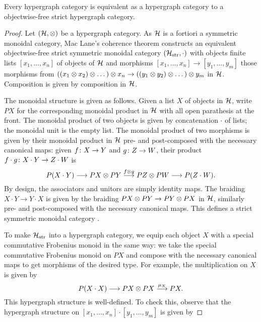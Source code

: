 \begin{proposition}
  Every hypergraph category is equivalent as a hypergraph category to a
  objectwise-free strict hypergraph category.
\end{proposition}
\begin{proof}
  Let $(\mathcal H,\otimes)$ be a hypergraph category. As $\mathcal H$ is a fortiori a
  symmetric monoidal category, Mac Lane's coherence theorem constructs
  an equivalent objectwise-free strict symmetric monoidal category $(\mathcal
  H_{\mathrm{str}}, \cdot)$ with objects finite lists $[x_1,\dots,x_n]$ of
  objects of $\mathcal H$ and morphisms $[x_1,\dots,x_n] \to [y_1,\dots,y_m]$ those
  morphisms from $((x_1 \otimes x_2) \otimes \dots) \otimes x_n \to ((y_1 \otimes y_2) \otimes
  \dots) \otimes y_m$ in $\mathcal H$.  Composition is given by composition in $\mathcal H$.
  
  The monoidal structure is given as follows. Given a list $X$ of objects in
  $\mathcal H$, write $PX$ for the corresponding monoidal product in $\mathcal H$ with all
  open parathesis at the front.  The monoidal product of two objects is given by
  concatenation $\cdot$ of lists; the monoidal unit is the empty list. The
  monoidal product of two morphisms is given by their monoidal product in $\mathcal
  H$ pre- and post-composed with the necessary canonical maps: given $f{\colon} X
  \to Y$ and $g{\colon} Z \to W$, their product $f\cdot g{\colon} X\cdot Y \to Z \cdot
  W$ is 
  \[
    P(X \cdot Y) \longrightarrow PX \otimes PY \stackrel{f \otimes g}{\longrightarrow}
    PZ \otimes PW \longrightarrow P(Z \cdot W).
  \]
  By design, the associators and unitors are simply identity maps. The braiding
  $X \cdot Y \to Y \cdot X$ is given by the braiding $PX \otimes PY \to PY \otimes PX$
  in $\mathcal H$, similarly pre- and post-composed with the necessary canonical
  maps. This defines a strict symmetric monoidal category \cite{Mac98}.

  To make $\mathcal H_{\mathrm{str}}$ into a hypergraph category, we equip each
  object $X$ with a special commutative Frobenius monoid in the same way: we
  take the special commutative Frobenius monoid on $PX$ and compose with the
  necessary canonical maps to get morphisms of the desired type. For example,
  the multiplication on $X$ is given by 
  \[
    P(X \cdot X) \longrightarrow PX \otimes PX \stackrel{\mu_X}\longrightarrow PX.
  \]
  This hypergraph structure is well-defined. To check this, observe that the
  hypergraph structure on $[x_1,\dots,x_n]\cdot[y_1,\dots,y_m]$ is given by 


\end{proof}
